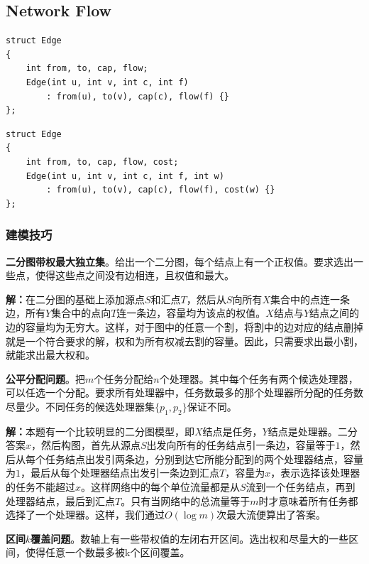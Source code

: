 \documentclass[twoside]{article}
\begin{document}
\subsection{Network Flow}
\begin{lstlisting}
struct Edge
{
    int from, to, cap, flow;
    Edge(int u, int v, int c, int f)
        : from(u), to(v), cap(c), flow(f) {}
};
\end{lstlisting}

\begin{lstlisting}
struct Edge
{
    int from, to, cap, flow, cost;
    Edge(int u, int v, int c, int f, int w)
        : from(u), to(v), cap(c), flow(f), cost(w) {}
};
\end{lstlisting}
\subsubsection*{建模技巧}


\indent

\textbf{二分图带权最大独立集}。给出一个二分图，每个结点上有一个正权值。要求选出一些点，使得这些点之间没有边相连，且权值和最大。

\indent

\textbf{解：}在二分图的基础上添加源点$S$和汇点$T$，然后从$S$向所有$X$集合中的点连一条边，所有$Y$集合中的点向$T$连一条边，容量均为该点的权值。$X$结点与$Y$结点之间的边的容量均为无穷大。这样，对于图中的任意一个割，将割中的边对应的结点删掉就是一个符合要求的解，权和为所有权减去割的容量。因此，只需要求出最小割，就能求出最大权和。

\indent

\textbf{公平分配问题}。把$m$个任务分配给$n$个处理器。其中每个任务有两个候选处理器，可以任选一个分配。要求所有处理器中，任务数最多的那个处理器所分配的任务数尽量少。不同任务的候选处理器集$\lbrace p_1 , p_2 \rbrace$保证不同。

\indent

\textbf{解：}本题有一个比较明显的二分图模型，即$X$结点是任务，$Y$结点是处理器。二分答案$x$，然后构图，首先从源点$S$出发向所有的任务结点引一条边，容量等于$1$，然后从每个任务结点出发引两条边，分别到达它所能分配到的两个处理器结点，容量为$1$，最后从每个处理器结点出发引一条边到汇点$T$，容量为$x$，表示选择该处理器的任务不能超过$x$。这样网络中的每个单位流量都是从$S$流到一个任务结点，再到处理器结点，最后到汇点$T$。只有当网络中的总流量等于$m$时才意味着所有任务都选择了一个处理器。这样，我们通过$O(\log m)$次最大流便算出了答案。

\indent

\textbf{区间$k$覆盖问题}。数轴上有一些带权值的左闭右开区间。选出权和尽量大的一些区间，使得任意一个数最多被k个区间覆盖。
\end{document}
